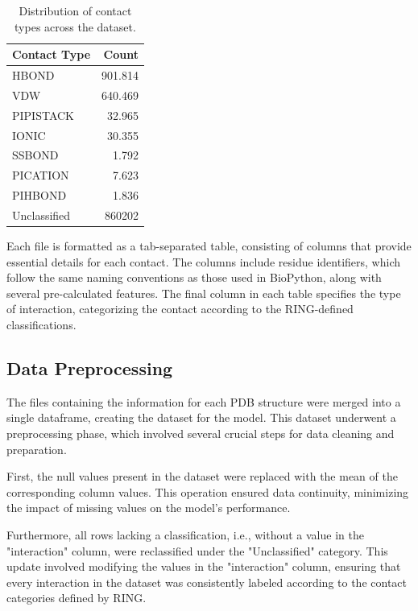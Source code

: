\documentclass[10pt,twocolumn,letterpaper]{article}
\begin{document}
\begin{table}[h!]
    \centering
    \begin{tabular}{|l|r|}
    \hline
    \textbf{Contact Type} & \textbf{Count} \\
    \hline
    HBOND & 901.814 \\
    VDW & 640.469 \\
    PIPISTACK & 32.965 \\
    IONIC & 30.355 \\
    SSBOND & 1.792 \\
    PICATION & 7.623 \\
    PIHBOND & 1.836 \\
    Unclassified & 860202 \\
    \hline
    \end{tabular}
    \caption{Distribution of contact types across the dataset.}
    \label{ref:DatasetDistribution}
\end{table}

Each file is formatted as a tab-separated table, consisting of columns that provide essential details for each contact. The columns include residue identifiers, which follow the same naming conventions as those used in BioPython, along with several pre-calculated features. The final column in each table specifies the type of interaction, categorizing the contact according to the RING-defined classifications.

\subsection{Data Preprocessing}

The files containing the information for each PDB structure were merged into a single dataframe, creating the dataset for the model. This dataset underwent a preprocessing phase, which involved several crucial steps for data cleaning and preparation.

First, the null values present in the dataset were replaced with the mean of the corresponding column values. This operation ensured data continuity, minimizing the impact of missing values on the model's performance.

Furthermore, all rows lacking a classification, i.e., without a value in the "interaction" column, were reclassified under the "Unclassified" category. This update involved modifying the values in the "interaction" column, ensuring that every interaction in the dataset was consistently labeled according to the contact categories defined by RING.
\end{document}
